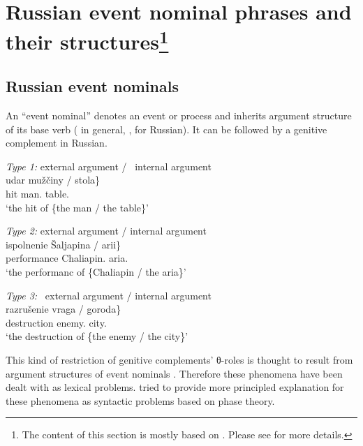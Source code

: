 \documentclass[output=paper,
]{langscibook}
\begin{document}
\section[Russian event nominal phrases and their structures]{Russian event nominal phrases and their structures\label{sec:EVN}\protect\footnote{The content of this section is mostly based on \cite{MiyauchiIto2016, Miyauchi2017b}. Please see \cite{MiyauchiIto2016, Miyauchi2017b} for more details.}} 

\subsection{Russian event nominals}

An ``event nominal'' denotes an event or process and inherits argument structure of its base verb (\citealt{Grimshaw1990} in general, \citealt{Schoorlemmer1998}, \citealt{Pazelskaya2007} for Russian). 
It can be followed by a genitive complement in Russian.

\begin{exe}\ex \label{type}%
\begin{xlist}
\ex \label{type1}
\textit{Type 1:}  external argument / \ internal argument\\\samepage
\gll	udar \minsp{\{} {mužčiny} / \minsp{*} {stola}\}\\
		hit {} man.{\GEN} {} {} table.{\GEN}\\
\trans `the hit of \{the man / the table\}'

\ex \label{type2}
\textit{Type 2:}  external argument /  internal argument\\
\gll	ispolnenie \minsp{\{} {Šaljapina} / {arii}\}\\
		performance {} Chaliapin.{\GEN} {} aria.{\GEN}\\
\trans `the performanc of \{Chaliapin / the aria\}'\samepage

\ex \label{type3}
\textit{Type 3:} \ external argument /  internal argument\\
\gll	razrušenie \minsp{\{*} {vraga} / {goroda}\}\\
		destruction {} enemy.{\GEN} {} city.{\GEN}\\
\trans `the destruction of \{the enemy / the city\}'
\end{xlist}
\end{exe}

\noindent This kind of restriction of genitive complements' θ-roles  is thought to result from argument structures of event nominals \citep{Pazelskaya2007}.
Therefore these phenomena have been dealt with as lexical problems.
\cite{MiyauchiIto2016, Miyauchi2017b} tried to provide more principled explanation for these phenomena as syntactic problems based on phase theory.
\end{document}
